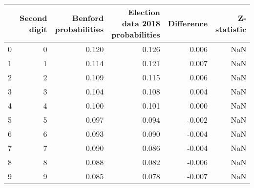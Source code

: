\begin{tabular}{lrrrrr}
\toprule
 & Second digit & Benford probabilities & Election data 2018 probabilities & Difference & Z-statistic \\
\midrule
0 & 0 & 0.120 & 0.126 & 0.006 & NaN \\
1 & 1 & 0.114 & 0.121 & 0.007 & NaN \\
2 & 2 & 0.109 & 0.115 & 0.006 & NaN \\
3 & 3 & 0.104 & 0.108 & 0.004 & NaN \\
4 & 4 & 0.100 & 0.101 & 0.000 & NaN \\
5 & 5 & 0.097 & 0.094 & -0.002 & NaN \\
6 & 6 & 0.093 & 0.090 & -0.004 & NaN \\
7 & 7 & 0.090 & 0.086 & -0.004 & NaN \\
8 & 8 & 0.088 & 0.082 & -0.006 & NaN \\
9 & 9 & 0.085 & 0.078 & -0.007 & NaN \\
\bottomrule
\end{tabular}
